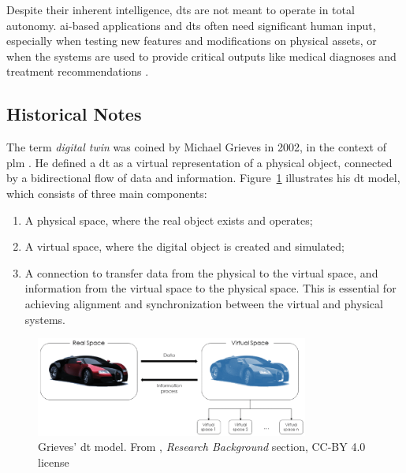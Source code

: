 Despite their inherent intelligence, \acrshort{dt}s are not meant to operate in total autonomy. \acrshort{ai}-based applications and \acrshort{dt}s often need significant human input, especially when testing new features and modifications on physical assets, or when the systems are used to provide critical outputs like medical diagnoses and treatment recommendations \parencite{barricelliSurveyDigitalTwin2019}.

\subsection{Historical Notes}

The term \textit{digital twin} was coined by Michael Grieves in 2002, in the context of \acrfull{plm} \parencite{grievesDigitalTwinManufacturing2014,grievesDigitalTwinMitigating2017}. He defined a \acrshort{dt} as a virtual representation of a physical object, connected by a bidirectional flow of data and information. Figure~\ref{fig:grieves_digital_twin} illustrates his \acrshort{dt} model, which consists of three main components:
\begin{enumerate}
    \item A physical space, where the real object exists and operates;
    \item A virtual space, where the digital object is created and simulated;
    \item A connection to transfer data from the physical to the virtual space, and information from the virtual space to the physical space. This is essential for achieving alignment and synchronization between the virtual and physical systems.
\end{enumerate}

\begin{figure}
    \centering
    \includegraphics[width=0.8\textwidth]{images/digital_twins/dt_model_grieves.png}
    \caption[Grieves' \acrshort{dt} model]{Grieves' \acrshort{dt} model. From \textcite{barricelliSurveyDigitalTwin2019}, \textit{Research Background} section, CC-BY 4.0 license}
    \label{fig:grieves_digital_twin}
\end{figure}

